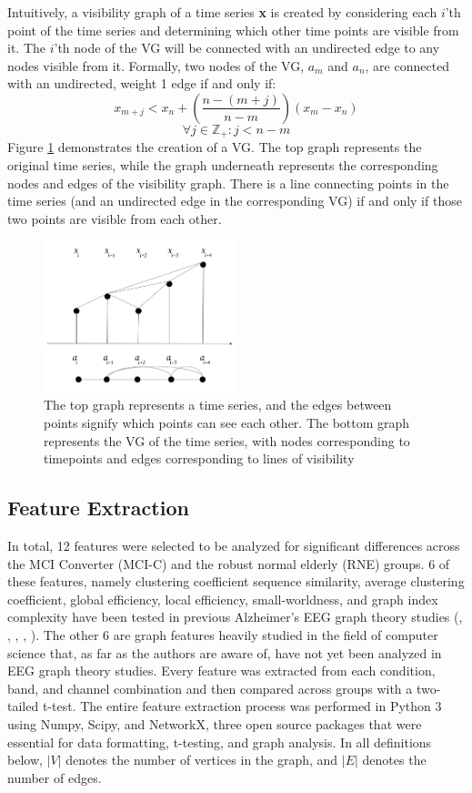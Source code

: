 \documentclass[Afour,times,sageh]{sagej}
\begin{document}
Intuitively, a visibility graph of a time series \textbf{x} is created by considering each $i$'th point of the time series and determining which other time points are visible from it. The $i$'th node of the VG will be connected with an undirected  edge to any nodes visible from it. Formally, two nodes of the VG, $a_m$ and $a_n$, are connected with an undirected, weight 1 edge if and only if: $$x_{m+j} < x_n + (\frac{n-(m+j)}{n-m})(x_m - x_n)$$ $$ \forall j \in \mathbb Z_+ : j < n - m$$
Figure \ref{VG} demonstrates the creation of a VG. The top graph represents the original time series, while the graph underneath represents the corresponding nodes and edges of the visibility graph. There is a line connecting points in the time series (and an undirected edge in the corresponding VG) if and only if those two points are visible from each other.
\begin{figure}
 \centering
\includegraphics[width=0.5\textwidth]{figures/VG}
\caption{The top graph represents a time series, and the edges between points signify which points can see each other. The bottom graph represents the VG of the time series, with nodes corresponding to timepoints and edges corresponding to lines of visibility}
\label{VG}
 \end{figure}
\subsection{Feature Extraction}
In total, 12 features were selected to be analyzed for significant differences across the MCI Converter (MCI-C) and the robust normal elderly (RNE) groups. 6 of these features, namely clustering coefficient sequence similarity, average clustering coefficient, global efficiency, local efficiency, small-worldness, and graph index complexity have been tested in previous Alzheimer’s EEG graph theory studies (\citet{Ahmadlou2010}, \citet{Wang2016}, \citet{Wang2017}, \citet{Kabbara}, \citet{Haan2009}). The other 6 are graph features heavily studied in the field of computer science that,  as far as the authors are aware of, have not yet been analyzed in EEG graph theory studies. Every feature was extracted from each condition, band, and channel combination and then compared across groups with a two-tailed t-test. The entire feature extraction process was performed in Python 3 using Numpy, Scipy, and NetworkX, three open source packages that were essential for data formatting, t-testing, and graph analysis. In all definitions below, $|V|$ denotes the number of vertices in the graph, and $|E|$ denotes the number of edges.
\end{document}
